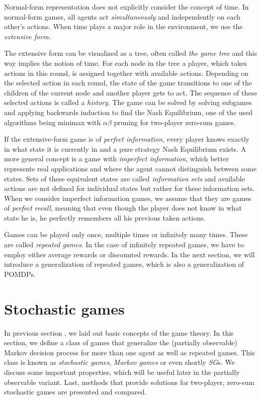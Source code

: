 \documentclass[../main.tex]{subfiles}
\begin{document}
Normal-form representation does not explicitly consider the concept of time.
In normal-form games, all agents act \textit{simultaneously} and independently on each other's actions.
When time plays a major role in the environment, we use the \textit{extensive form}.

The extensive form can be visualized as a tree, often called \textit{the game tree} and this way implies the notion of time.
For each node in the tree a player, which takes actions in this round, is assigned together with available actions.
Depending on the selected action in each round, the state of the game transitions to one of the children of the current node and another player gets to act.
The sequence of these selected actions is called a \textit{history}.
The game can be solved by solving subgames and applying backwards induction to find the Nash Equilibrium, one of the used algorithms being minimax with $\alpha\beta$ pruning for two-player zero-sum games.

If the extensive-form game is of \textit{perfect information}, every player knows exactly in what state it is currently in and a pure strategy Nash Equilibrium exists\cite{zermelo}.
A more general concept is a game with \textit{imperfect information}, which better represents real applications and where the agent cannot distinguish between some states.
Sets of these equivalent states are called \textit{information sets} and available actions are not defined for individual states but rather for these information sets.
When we consider imperfect information games, we assume that they are games of \textit{perfect recall}, meaning that even though the player does not know in what state he is, he perfectly remembers all his previous taken actions.

Games can be played only once, multiple times or infinitely many times. These are called \textit{repeated games}.
In the case of infinitely repeated games, we have to employ either average rewards or discounted rewards.
In the next section, we will introduce a generalization of repeated games, which is also a generalization of POMDPs.

\section{Stochastic games}\label{bg:sg}
In previous section , we laid out basic concepts of the game theory.
In this section, we define a class of games that generalize the (partially observable) Markov decision process for more than one agent as well as repeated games.
This class is known as \textit{stochastic games}, \textit{Markov games} or even shortly \textit{SG}s.
We discuss some important properties, which will be useful later in the partially observable variant.
Last, methods that provide solutions for two-player, zero-sum stochastic games are presented and compared.
\end{document}
